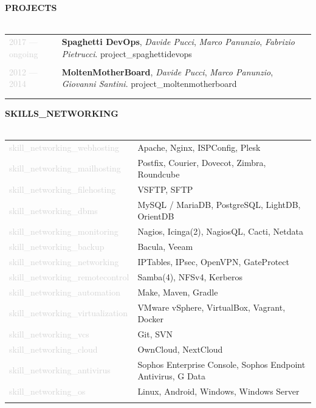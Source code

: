 \documentclass{article}
\begin{document}
\newpage

\textbf{\textcolor{deepblue}{\uppercase{{{projects}}}}} \\\\ \hfill
\begin{tabular}{ R{3cm} L{12cm} }
	\textcolor{lightgray}{2017 — {{ongoing}}} & \textbf{Spaghetti DevOps}, \textit{Davide Pucci}, \textit{Marco Panunzio}, \textit{Fabrizio Pietrucci}. \linebreak
		{{project_spaghettidevops}}  \\\\ \hfill
	\textcolor{lightgray}{2012 — 2014} &
		\textbf{MoltenMotherBoard}, \textit{Davide Pucci}, \textit{Marco Panunzio}, \textit{Giovanni Santini}. \linebreak
		{{project_moltenmotherboard}} \\\\ \hfill
\end{tabular}

\textbf{\textcolor{deepblue}{\uppercase{{{skills_networking}}}}} \\\\ \hfill
\begin{tabular}{ R{4cm} L{11cm} }
	\textcolor{lightgray}{{{skill_networking_webhosting}}} & Apache, Nginx, ISPConfig, Plesk \\ \hfill
	\textcolor{lightgray}{{{skill_networking_mailhosting}}} & Postfix, Courier, Dovecot, Zimbra, Roundcube \\ \hfill
	\textcolor{lightgray}{{{skill_networking_filehosting}}} & VSFTP, SFTP \\ \hfill
	\textcolor{lightgray}{{{skill_networking_dbms}}} & MySQL / MariaDB, PostgreSQL, LightDB, OrientDB \\ \hfill
	\textcolor{lightgray}{{{skill_networking_monitoring}}} & Nagios, Icinga(2), NagiosQL, Cacti, Netdata \\ \hfill
	\textcolor{lightgray}{{{skill_networking_backup}}} & Bacula, Veeam \\ \hfill
	\textcolor{lightgray}{{{skill_networking_networking}}} & IPTables, IPsec, OpenVPN, GateProtect \\ \hfill
	\textcolor{lightgray}{{{skill_networking_remotecontrol}}} & Samba(4), NFSv4, Kerberos \\ \hfill
	\textcolor{lightgray}{{{skill_networking_automation}}} & Make, Maven, Gradle \\ \hfill
	\textcolor{lightgray}{{{skill_networking_virtualization}}} & VMware vSphere, VirtualBox, Vagrant, Docker \\ \hfill
	\textcolor{lightgray}{{{skill_networking_vcs}}} & Git, SVN \\ \hfill
	\textcolor{lightgray}{{{skill_networking_cloud}}} & OwnCloud, NextCloud \\ \hfill
	\textcolor{lightgray}{{{skill_networking_antivirus}}} & Sophos Enterprise Console, Sophos Endpoint Antivirus, G Data \\ \hfill
	\textcolor{lightgray}{{{skill_networking_os}}} & Linux, Android, Windows, Windows Server \\ \hfill
\end{tabular}
\end{document}
